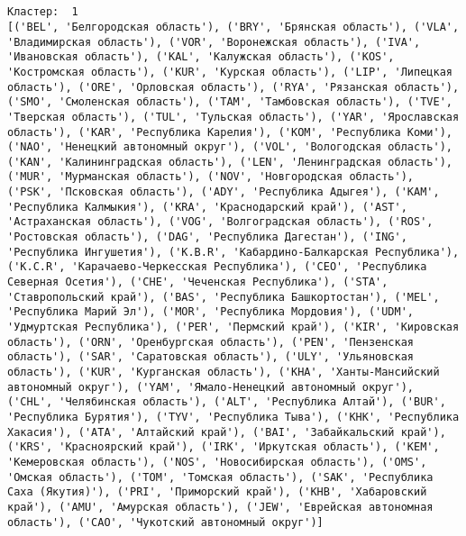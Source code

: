\documentclass[11pt]{article}
\begin{document}
    \begin{center}
    \end{center}
    { \hspace*{\fill} \\}
    
    \begin{Verbatim}[commandchars=\\\{\}]

Кластер:  1
[('BEL', 'Белгородская область'), ('BRY', 'Брянская область'), ('VLA', 'Владимирская область'), ('VOR', 'Воронежская область'), ('IVA', 'Ивановская область'), ('KAL', 'Калужская область'), ('KOS', 'Костромская область'), ('KUR', 'Курская область'), ('LIP', 'Липецкая область'), ('ORE', 'Орловская область'), ('RYA', 'Рязанская область'), ('SMO', 'Смоленская область'), ('TAM', 'Тамбовская область'), ('TVE', 'Тверская область'), ('TUL', 'Тульская область'), ('YAR', 'Ярославская область'), ('KAR', 'Республика Карелия'), ('KOM', 'Республика Коми'), ('NAO', 'Ненецкий автономный округ'), ('VOL', 'Вологодская область'), ('KAN', 'Калинингpадская область'), ('LEN', 'Ленинградская область'), ('MUR', 'Мурманская область'), ('NOV', 'Новгородская область'), ('PSK', 'Псковская область'), ('ADY', 'Республика Адыгея'), ('KAM', 'Республика Калмыкия'), ('KRA', 'Краснодарский край'), ('AST', 'Астраханская область'), ('VOG', 'Волгоградская область'), ('ROS', 'Ростовская область'), ('DAG', 'Республика Дагестан'), ('ING', 'Республика Ингушетия'), ('K.B.R', 'Кабардино-Балкарская Республика'), ('K.C.R', 'Карачаево-Черкесская Республика'), ('CEO', 'Республика Северная Осетия'), ('CHE', 'Чеченская Республика'), ('STA', 'Ставропольский край'), ('BAS', 'Республика Башкортостан'), ('MEL', 'Республика Марий Эл'), ('MOR', 'Республика Мордовия'), ('UDM', 'Удмуртская Республика'), ('PER', 'Пермский край'), ('KIR', 'Кировская область'), ('ORN', 'Оренбургская область'), ('PEN', 'Пензенская область'), ('SAR', 'Саратовская область'), ('ULY', 'Ульяновская область'), ('KUR', 'Курганская область'), ('KHA', 'Ханты-Мансийский автономный округ'), ('YAM', 'Ямало-Ненецкий автономный округ'), ('CHL', 'Челябинская область'), ('ALT', 'Республика Алтай'), ('BUR', 'Республика Бурятия'), ('TYV', 'Республика Тыва'), ('KHK', 'Республика Хакасия'), ('ATA', 'Алтайский край'), ('BAI', 'Забайкальский край'), ('KRS', 'Красноярский край'), ('IRK', 'Иркутская область'), ('KEM', 'Кемеровская область'), ('NOS', 'Новосибирская область'), ('OMS', 'Омская область'), ('TOM', 'Томская область'), ('SAK', 'Республика Саха (Якутия)'), ('PRI', 'Приморский край'), ('KHB', 'Хабаровский край'), ('AMU', 'Амурская область'), ('JEW', 'Еврейская автономная область'), ('CAO', 'Чукотский автономный округ')]


\end{Verbatim}
\end{document}
